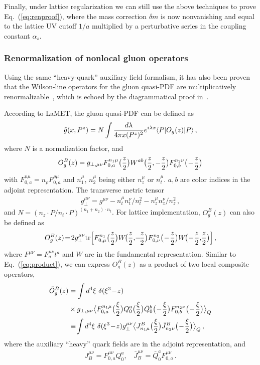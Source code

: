 \documentclass[aps,rmp,reprint,amsmath,amssymb,graphicx,longbibliography]{revtex4-1} %
\newcommand{\beq}{\begin{eqnarray}}
\newcommand{\eeq}{\end{eqnarray}}
\newcommand{\nn}{\nonumber}
\DeclareRobustCommand{\eq}[1]{Eq.~(\ref{eq:#1})}
\begin{document}
Finally, under lattice regularization we can still use the above techniques to prove \eq{renproof}, where the mass correction $\delta m$ is now nonvanishing and equal to the lattice UV cutoff $1/a$ multiplied by a perturbative series in the coupling constant $\alpha_s$.

\subsubsection{Renormalization of nonlocal gluon operators}

Using the same ``heavy-quark'' auxiliary field formalism, it has also been proven that the Wilson-line operators for the gluon quasi-PDF are multiplicatively renormalizable~\cite{Zhang:2018diq}, which is echoed by the diagrammatical proof in~\cite{Li:2018tpe}.

According to LaMET, the gluon quasi-PDF can be defined as~\cite{Ji:2013dva}
\begin{align} \label{eq:quasigluon}
	\tilde g(x,P^z) = N\int {d\lambda \over 4\pi x (P^z)^2}e^{i\lambda x} \langle P| O_g(z)|P\rangle\,,
\end{align}
where $N$ is a normalization factor, and
\begin{align}
	O^B_g(z) = g_{\perp,\mu\nu} F^{n_1\mu}_{0,a}\big({z\over2}\big) W^{ab}\big({z\over2},-{z\over2}\big) F^{n_2\nu}_{0,b}\big(\!-\!{z\over2}\big)
\end{align}
with $F^{n\mu}_{0,a}=n_\rho F^{\rho\mu}_{0,a}$ and $n_1^\mu$, $n_2^\mu$ being either $n_z^\mu$ or $n_t^\mu$. $a,b$ are color indices in the adjoint representation. The transverse metric tensor
\begin{align}
	g_\perp^{\mu \nu} = g^{\mu \nu}  - n_t^\mu n_t^\nu / n_t^2 - n_z^\mu n_z^\nu /n_z^2\,,
\end{align}
and $N = (n_z\cdot P/n_t\cdot P)^{(n_1+n_2)\cdot n_t}$.
For lattice implementation, $O^B_g(z)$ can also be defined as~\cite{Dorn:1986dt,Zhang:2018diq}
\begin{align}
	O^B_g(z)\!=\! 2g_{\perp}^{\mu\nu}\mbox{tr}\Big[F^{n_1}_{0,\mu}\big({z\over2}\big)W\!\big({z\over2},\!-\!{z\over2}\big)F^{n_2}_{0,\nu}\big(\!-\!{z\over2}\big)W\!\big(\!-\!{z\over2},\!{z\over2}\big)\Big]\,,
\end{align}
where $F^{\mu\nu}=F^{\mu\nu}_at^a$ and $W$ are in the fundamental representation.
Similar to \eq{product}, we can express $O^B_g(z)$ as a product of two local composite operators,
\begin{align} \label{eq:gluonprod}
	\tilde{O}_g^B(z)&=\int d^4\xi\ \delta(\xi^3\!-\!z)\\
	&\times g_{\perp,\mu\nu}\big\langle F^{n_1\mu}_{0,a}\big({\xi\over2}\big)Q^a_0\big({\xi\over2}\big)\bar{Q}^b_0\big(\!-\!{\xi\over2}\big)F^{n_2\nu}_{0,b}\big(\!-\!{\xi\over2}\big)\big\rangle_Q\nn\\
	&\equiv\!\int d^4\xi\ \delta(\xi^3\!-\!z) g_{\perp}^{\mu\nu}\big\langle J^{B}_{n_1\mu}\big({\xi\over2}\big)\bar{J}^{B}_{n_2\nu}\big(\!-\!{\xi\over2}\big)\big\rangle_Q\,,\nn
\end{align}
where the auxiliary ``heavy'' quark fields are in the adjoint representation, and
\beq
J^{\mu\nu}_B= F^{\mu\nu}_{0,a}Q_0^a,\ \ \ \ \bar{J}^{\mu\nu}_B= \bar{Q}_0^aF^{\mu\nu}_{0,a}\,.
\eeq
\end{document}
